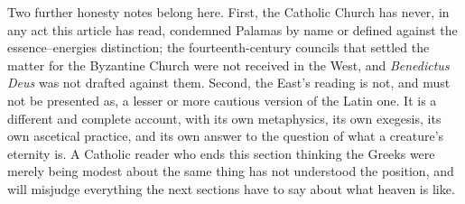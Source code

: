 Two further honesty notes belong here. First, the Catholic Church has never, in any act this article has read, condemned Palamas by name or defined against the essence--energies distinction; the fourteenth-century councils that settled the matter for the Byzantine Church were not received in the West, and \emph{Benedictus Deus} was not drafted against them. Second, the East's reading is not, and must not be presented as, a lesser or more cautious version of the Latin one. It is a different and complete account, with its own metaphysics, its own exegesis, its own ascetical practice, and its own answer to the question of what a creature's eternity is. A Catholic reader who ends this section thinking the Greeks were merely being modest about the same thing has not understood the position, and will misjudge everything the next sections have to say about what heaven is like.
